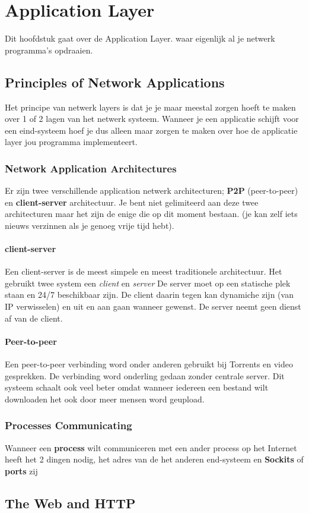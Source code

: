 \section{Application Layer}
Dit hoofdstuk gaat over de Application Layer. waar eigenlijk al je netwerk programma's opdraaien.
\subsection{Principles of Network Applications}
Het principe van netwerk layers is dat je je maar meestal zorgen hoeft te maken over 1 of 2 lagen van het netwerk systeem. Wanneer je een applicatie schijft voor een eind-systeem hoef je dus alleen maar zorgen te maken over hoe de applicatie layer jou programma implementeert.

\subsubsection{Network Application Architectures}
Er zijn twee verschillende application netwerk architecturen; \textbf{P2P} (peer-to-peer) en \textbf{client-server} architectuur. Je bent niet gelimiteerd aan deze twee architecturen maar het zijn de enige die op dit moment bestaan. (je kan zelf iets nieuws verzinnen als je genoeg vrije tijd hebt).

\paragraph{client-server}
Een client-server is de meest simpele en meest traditionele architectuur. Het gebruikt twee system een \textit{client} en \textit{server} De server moet op een statische plek staan en 24/7 beschikbaar zijn. De client daarin tegen kan dynamiche zijn (van IP verwisselen) en uit en aan gaan wanneer gewenst. De server neemt geen dienst af van de client.
\paragraph{Peer-to-peer}
Een peer-to-peer verbinding word onder anderen gebruikt bij Torrents en video gesprekken. De verbinding word onderling gedaan zonder centrale server. Dit systeem schaalt ook veel beter omdat wanneer iedereen een bestand wilt downloaden het ook door meer mensen word geupload.

\subsubsection{Processes Communicating}
Wanneer een \textbf{process} wilt communiceren met een ander process op het Internet heeft het 2 dingen nodig, het adres van de het anderen end-systeem en 
\textbf{Sockits} of \textbf{ports} zij



\subsection{The Web and HTTP}